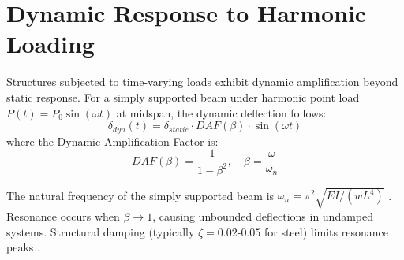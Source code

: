 \documentclass[11pt,a4paper]{article}
\begin{document}
\section{Dynamic Response to Harmonic Loading}

Structures subjected to time-varying loads exhibit dynamic amplification beyond static response. For a simply supported beam under harmonic point load $P(t) = P_0 \sin(\omega t)$ at midspan, the dynamic deflection follows:
\begin{equation}
\delta_{dyn}(t) = \delta_{static} \cdot DAF(\beta) \cdot \sin(\omega t)
\end{equation}
where the Dynamic Amplification Factor is:
\begin{equation}
DAF(\beta) = \frac{1}{1 - \beta^2}, \quad \beta = \frac{\omega}{\omega_n}
\end{equation}

The natural frequency of the simply supported beam is $\omega_n = \pi^2 \sqrt{EI/(wL^4)}$ \cite{clough2003dynamics}. Resonance occurs when $\beta \to 1$, causing unbounded deflections in undamped systems. Structural damping (typically $\zeta = 0.02$-$0.05$ for steel) limits resonance peaks \cite{chopra2012dynamics}.
\end{document}
